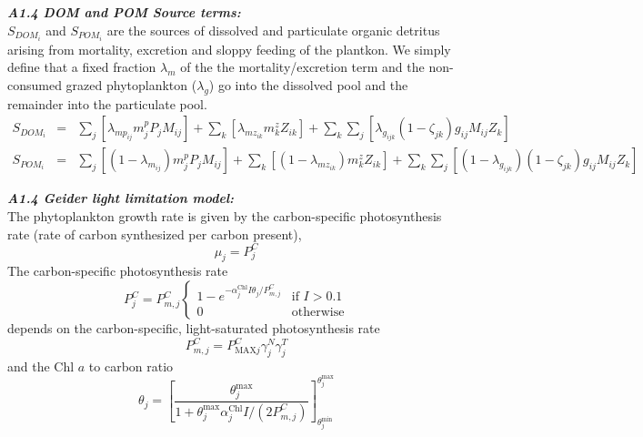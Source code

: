 \documentclass[11pt,letterpaper,english]{article}
\begin{document}
 
{\it {\bf A1.4 DOM and POM Source terms:}}\\
$S_{DOM_i}$ and $S_{POM_i}$ are the sources of dissolved and particulate
organic detritus arising from mortality, excretion and sloppy feeding of the
plantkon. We simply define that a fixed fraction $\lambda_m$ of the the
mortality/excretion term and the non-consumed grazed phytoplankton
($\lambda_g$) go into the dissolved pool and the remainder into the particulate
pool. 
\begin{eqnarray}
S_{DOM_i} & = & \sum_{j} [\lambda_{mp_{ij}} m^p_j P_j M_{ij}] 
             + \sum_{k} [\lambda_{mz_{ik}} m^z_k Z_{ik}]
             + \sum_{k} \sum_{j} [\lambda_{g_{ijk}} (1-\zeta_{jk})
                                        g_{ij} M_{ij} Z_k ]
\nonumber \\
S_{POM_i} & = & \sum_{j} [(1-\lambda_{m_{ij}}) m^p_j P_j M_{ij}]
             + \sum_{k} [(1-\lambda_{mz_{ik}}) m^z_k Z_{ik}]
             + \sum_{k} \sum_{j} [(1-\lambda_{g_{ijk}}) (1-\zeta_{jk})  
                                       g_{ij} M_{ij} Z_k ]
\nonumber
\end{eqnarray}


\newcommand{\pcm}[1]{P^C_{m#1}}
\newcommand{\pcmax}[1]{P^C_{\textrm{MAX}#1}}
\newcommand{\pcarbon}{P^C}
\newcommand{\chltoc}{\theta}
\newcommand{\chltocmax}{\theta^{\textrm{max}}}
\newcommand{\chltocmin}{\theta^{\textrm{min}}}
\newcommand{\alphachl}{\alpha^{\textrm{Chl}}}
\newcommand{\mQyield}{\mathit{mQ}^{\textrm{yield}}}
\newcommand{\RPC}{R^{PC}}
\newcommand{\phychl}{\mathit{Chl}}
\newcommand{\aphychlave}{A^{\mathrm{phy}}_{\mathrm{Chl,ave}}}

{\it {\bf A1.4 Geider light limitation model:}}\\
The phytoplankton growth rate is given by the carbon-specific photosynthesis rate
(rate of carbon synthesized per carbon present),
\[
  \mu_j = \pcarbon_j
\]
The carbon-specific photosynthesis rate
\[
  \pcarbon_j = \pcm{,j} \begin{cases}
     1 - e^{-\alphachl_j I \chltoc_j/\pcm{,j}} & \text{if }I>0.1 \\
     0                                         & \text{otherwise}
   \end{cases}
\]
depends on the carbon-specific, light-saturated photosynthesis rate
\[
  \pcm{,j}=\pcmax{j} \gamma^N_j \gamma^T_j
\]
and the Chl $a$ to carbon ratio
\[
  \chltoc_j = \left[ \frac{\chltocmax_j}
                   {1 + \chltocmax_j \alphachl_j I / (2 \pcm{,j})}
		   \right]^{\chltocmax_j}_{\chltocmin_j}
\]
\end{document}
